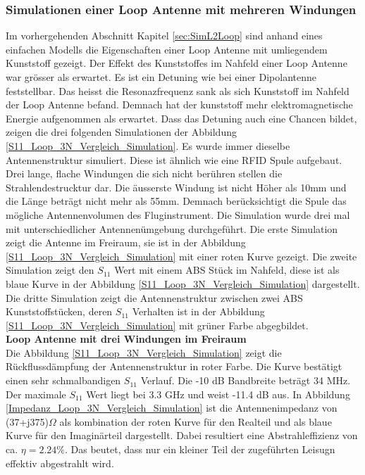 \subsubsection{Simulationen einer Loop Antenne mit mehreren Windungen}
Im vorhergehenden Abschnitt Kapitel \ref{sec:SimL2Loop} sind anhand eines einfachen Modells die Eigenschaften einer Loop Antenne mit umliegendem Kunststoff gezeigt. Der Effekt des Kunststoffes im Nahfeld einer Loop Antenne war grösser als erwartet. Es ist ein Detuning wie bei einer Dipolantenne feststellbar. Das heisst die Resonazfrequenz sank als sich Kunststoff im Nahfeld der Loop Antenne befand. Demnach hat der kunststoff mehr elektromagnetische Energie aufgenommen als erwartet. Dass das Detuning auch eine Chancen bildet, zeigen die drei folgenden Simulationen der Abbildung \ref{S11_Loop_3N_Vergleich_Simulation}. Es wurde immer dieselbe Antennenstruktur simuliert. Diese ist ähnlich wie eine RFID Spule aufgebaut. Drei lange, flache Windungen die sich nicht berühren stellen die Strahlendestrucktur dar. Die äusserste Windung ist nicht Höher als 10mm und die Länge beträgt nicht mehr als 55mm. Demnach  berücksichtigt die Spule das mögliche Antennenvolumen des Fluginstrument. Die Simulation wurde drei mal mit unterschiedlicher Antennenümgebung durchgeführt. Die erste Simulation zeigt die Antenne im Freiraum, sie ist in der Abbildung \ref{S11_Loop_3N_Vergleich_Simulation} mit einer roten Kurve gezeigt. Die zweite Simulation zeigt den $S_{11}$ Wert mit einem ABS Stück im Nahfeld, diese ist als blaue Kurve in der Abbildung \ref{S11_Loop_3N_Vergleich_Simulation} dargestellt. Die dritte Simulation zeigt die Antennenstruktur zwischen zwei ABS Kunststoffstücken, deren $S_{11}$ Verhalten ist in der Abbildung \ref{S11_Loop_3N_Vergleich_Simulation} mit grüner Farbe abgegbildet.\\

\textbf{Loop Antenne mit drei Windungen im Freiraum}\\
Die Abbildung \ref{S11_Loop_3N_Vergleich_Simulation} zeigt die Rückflussdämpfung der Antennenstruktur in roter Farbe. Die Kurve bestätigt  einen sehr schmalbandigen $S_{11}$ Verlauf. Die -10 dB Bandbreite beträgt 34 MHz. Der maximale $S_{11}$ Wert liegt bei 3.3 GHz und weist -11.4 dB aus. In Abbildung \ref{Impedanz_Loop_3N_Vergleich_Simulation} ist die Antennenimpedanz von (37+j375)$\Omega$ als kombination der roten Kurve für den Realteil und als blaue Kurve für den Imaginärteil dargestellt. Dabei resultiert eine Abstrahleffizienz von ca. $\eta=2.24\%$. Das beutet, dass nur ein kleiner Teil der zugeführten Leisugn effektiv abgestrahlt wird.

